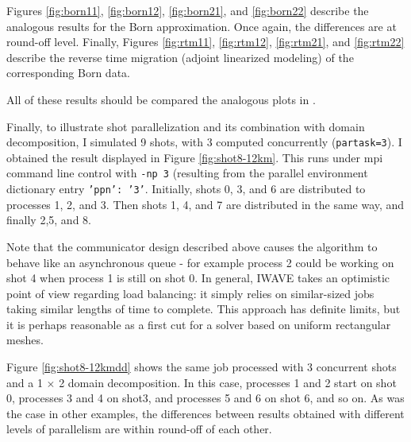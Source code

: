 Figures \ref{fig:born11}, \ref{fig:born12}, \ref{fig:born21}, and \ref{fig:born22} describe the analogous results for the Born approximation. Once again, the differences are at round-off level. Finally, Figures \ref{fig:rtm11}, \ref{fig:rtm12}, \ref{fig:rtm21}, and \ref{fig:rtm22} describe the reverse time migration (adjoint linearized modeling) of the corresponding Born data. 

All of these results should be compared the analogous plots in \cite{trip14:struct}. 

Finally, to illustrate shot parallelization and its combination with domain decomposition, I simulated 9 shots, with 3 computed concurrently ({\tt partask=3}). I obtained the result displayed in Figure \ref{fig:shot8-12km}. This runs under mpi command line control with {\tt -np 3} (resulting from the parallel environment dictionary entry {\tt 'ppn': '3'}. Initially, shots 0, 3, and 6 are distributed to processes 1, 2, and 3. Then shots 1, 4, and 7 are distributed in the same way, and finally 2,5, and 8. 

Note that the communicator design described above causes the algorithm to behave like an asynchronous queue - for example process 2 could be working on shot 4 when process 1 is still on shot 0. In general, IWAVE takes an optimistic point of view regarding load balancing: it simply relies on similar-sized jobs taking similar lengths of time to complete. This approach has definite limits, but it is perhaps reasonable as a first cut for a solver based on uniform rectangular meshes.

Figure \ref{fig:shot8-12kmdd} shows the same job processed with 3 concurrent shots and a 1 $\times$ 2 domain decomposition. In this case, processes 1 and 2 start on shot 0, processes 3 and 4 on shot3, and processes 5 and 6 on shot 6, and so on. As was the case in other examples, the differences between results obtained with different levels of parallelism are within round-off of each other.

 
